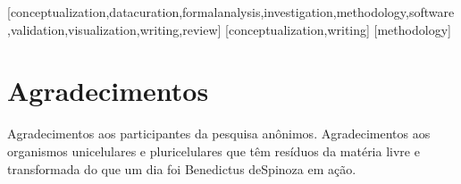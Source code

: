 \documentclass[portuguese]{textolivre}
\begin{document}
\printbibliography\label{sec-bib}


\begin{contributors}
[conceptualization,datacuration,formalanalysis,investigation,methodology,software,validation,visualization,writing,review]
[conceptualization,writing]
[methodology]
\end{contributors}

\section*{\fontsize{10}{12}\selectfont Agradecimentos}
Agradecimentos aos participantes da pesquisa anônimos. Agradecimentos aos organismos unicelulares e pluricelulares que têm resíduos da matéria livre e transformada do que um dia foi Benedictus deSpinoza em ação.

\begin{dataavailability}
\end{dataavailability}
\end{document}
